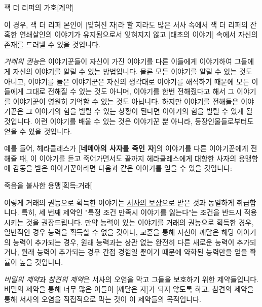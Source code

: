 \documentclass{report}
\begin{document}
	\begin{story}{잭 더 리퍼의 가호}{[계약]}
	\end{story}
	
	이 경우, 잭 더 리퍼 본인이 [잊혀진 자]라 할 지라도 많은 서사 속에서 잭 더 리퍼의 잔혹한 연쇄살인의 이야기가 유지됨으로서 잊혀지지 않고 [태초의 이야기] 속에서 자신의 존재를 드러낼 수 있을 것입니다.
	
	\smallskip
	
	\emph{거래의 권능}은 이야기꾼들이 자신이 가진 이야기를 다른 이들에게 이야기하여 그들에게 자신의 이야기를 알릴 수 있는 방법입니다. 물론 모든 이야기를 알릴 수 있는 것도 아니고, 이야기를 들은 이야기꾼은 자신의 생각대로 이야기를 해석하기 때문에 모든 이들에게 그대로 전해질 수 있는 것도 아니며, 이야기를 한번 전해줬다고 해서 그 이야기를 이야기꾼이 영원히 기억할 수 있는 것도 아닙니다. 하지만 이야기를 전해들은 이야기꾼은 그 이야기의 힘을 빌릴 수 있는 상황이 된다면 이야기의 힘을 빌릴 수 있게 될 것입니다. 이런 이야기를 배울 수 있는 것은 이야기꾼 뿐 아니라, 등장인물들로부터도 얻을 수 있을 것입니다.
	
	예를 들어, 헤라클레스가 \textbf{[네메아의 사자를 죽인 자]}의 이야기를 다른 이야기꾼에게 전해줄 때, 이 이야기를 듣고 죽어가면서도 끝까지 헤라클레스에게 대항한 사자의 용맹함에 감동을 받은 이야기꾼이라면 다음과 같은 이야기를 얻을 수 있을 것입니다:
	
	\begin{story}{죽음을 불사한 용맹}{[획득:거래]}
		
	\end{story}
	
	이렇게 거래의 권능으로 획득한 이야기는 \hyperlink{reward}{서사의 보상}으로 받은 것과 동일하게 취급합니다. 특히, 세 번째 제약인 "특정 조건 만족시 이야기를 잃는다"는 조건을 반드시 적용시키는 것을 권장드립니다. 만약 능력이 있는 이야기를 거래의 권능으로 획득한 경우, 일반적인 경우 능력을 획득할 수 없을 것이나, 교훈을 통해 자신이 깨달은 해당 이야기의 능력이 추가되는 경우, 원래 능력과는 상관 없는 완전히 다른 새로운 능력이 추가되거나, 원래 능력이 추가되는 경우 간접 경험일 뿐이기 때문에 약화된 능력만을 얻을 확률이 높을 것입니다.
	
	\smallskip
	
	\emph{비밀의 제약}과 \emph{참견의 제약}은 서사의 오염을 막고 그들을 보호하기 위한 제약들입니다. 비밀의 제약을 통해 너무 많은 이들이 [깨달은 자]가 되지 않도록 하고, 참견의 제약을 통해 서사의 오염을 직접적으로 막는 것이 이 제약들의 목적입니다.
	
\end{document}
